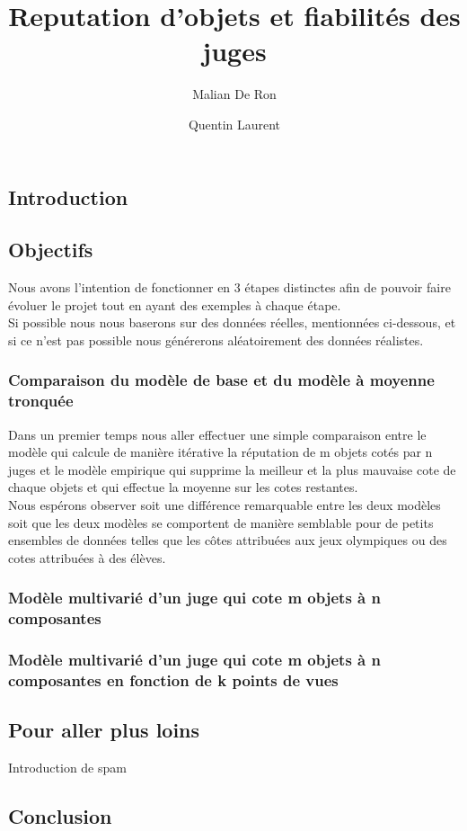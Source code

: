 \documentclass[12pt,a4paper,notitlepage]{article}
\title{Reputation d'objets et fiabilités des juges}
\author{Malian De Ron \and Quentin Laurent}
\begin{document}
\maketitle

\subsection*{Introduction}

\subsection*{Objectifs}

Nous avons l'intention de fonctionner en 3 étapes distinctes afin de pouvoir faire évoluer le projet tout en ayant des exemples à chaque étape.\\

Si possible nous nous baserons sur des données réelles, mentionnées ci-dessous, et si ce n'est pas possible nous générerons aléatoirement des données réalistes.

\subsubsection*{Comparaison du modèle de base et du modèle à moyenne tronquée}

Dans un premier temps nous aller effectuer une simple comparaison entre le modèle qui calcule de manière itérative la réputation de m objets cotés par n juges et le modèle empirique qui supprime la meilleur et la plus mauvaise cote de chaque objets et qui effectue la moyenne sur les cotes restantes.\\

Nous espérons observer soit une différence remarquable entre les deux modèles soit que les deux modèles se comportent de manière semblable pour de petits ensembles de données telles que les côtes attribuées aux jeux olympiques ou des cotes attribuées à des élèves.

\subsubsection*{Modèle multivarié d'un juge qui cote m objets à n composantes}

\subsubsection*{Modèle multivarié d'un juge qui cote m objets à n composantes en fonction de k points de vues}

\subsection*{Pour aller plus loins}

Introduction de spam

\subsection*{Conclusion}
\end{document}
